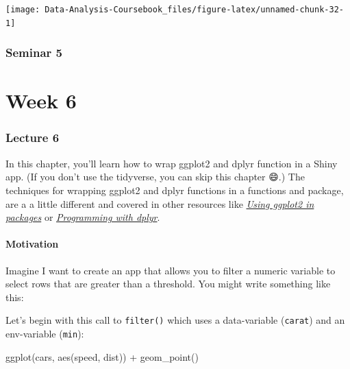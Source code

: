 \documentclass[
]{article}
\newenvironment{Shaded}{\begin{snugshade}}{\end{snugshade}}
\newcommand{\FunctionTok}[1]{\textcolor[rgb]{0.00,0.00,0.00}{#1}}
\newcommand{\NormalTok}[1]{#1}
\newcommand{\SpecialCharTok}[1]{\textcolor[rgb]{0.00,0.00,0.00}{#1}}
\begin{document}
\begin{center}\texttt{[image: Data-Analysis-Coursebook\_files/figure-latex/unnamed-chunk-32-1]} \end{center}

\hypertarget{seminar5}{%
\section{Seminar 5}\label{seminar5}}

\hypertarget{part-week-6}{%
\part*{Week 6}\label{part-week-6}}

\hypertarget{lecture6}{%
\section{Lecture 6}\label{lecture6}}

In this chapter, you'll learn how to wrap ggplot2 and dplyr function in a Shiny app.
(If you don't use the tidyverse, you can skip this chapter 😄.) The techniques for wrapping ggplot2 and dplyr functions in a functions and package, are a a little different and covered in other resources like \href{http://ggplot2.tidyverse.org/dev/articles/ggplot2-in-packages.html}{\emph{Using ggplot2 in packages}} or \href{http://dplyr.tidyverse.org/articles/programming.html}{\emph{Programming with dplyr}}.

\hypertarget{tidy-motivation}{%
\subsection{Motivation}\label{tidy-motivation}}

Imagine I want to create an app that allows you to filter a numeric variable to select rows that are greater than a threshold.
You might write something like this:

Let's begin with this call to \texttt{filter()} which uses a data-variable (\texttt{carat}) and an env-variable (\texttt{min}):

\begin{Shaded}
\begin{Highlighting}[]
\FunctionTok{ggplot}\NormalTok{(cars, }\FunctionTok{aes}\NormalTok{(speed, dist)) }\SpecialCharTok{+} 
  \FunctionTok{geom\_point}\NormalTok{()}
\end{Highlighting}
\end{Shaded}
\end{document}

